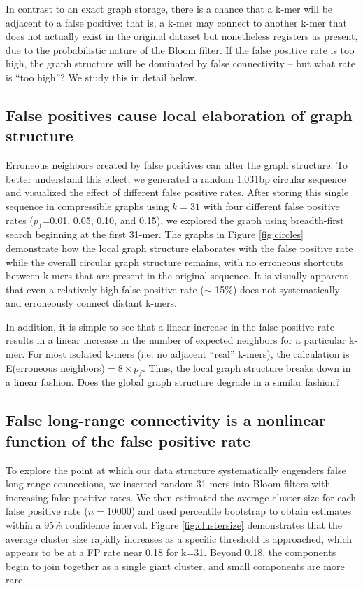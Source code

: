 \documentclass{pnastwo}
\begin{document}
\begin{article}
In contrast to an exact graph storage, there is a chance that a k-mer will
be adjacent to a false positive: that is, a k-mer may connect to another k-mer that does not
actually exist in the original dataset but nonetheless registers as present,
due to the probabilistic nature of the Bloom filter.  If the false positive rate is too high, the graph structure will
be dominated by false connectivity -- but what rate is ``too high''?  We study this in detail below.

\subsection{False positives cause local elaboration of graph structure}

Erroneous neighbors created by false positives can alter the graph
structure.  To better understand this effect, we generated a random
1,031bp circular sequence and visualized the effect of different false
positive rates.  After storing this single sequence in compressible
graphs using $k=31$ with four different false positive rates
($p_f$=0.01, 0.05, 0.10, and 0.15), we explored the graph using
breadth-first search beginning at the first 31-mer.  The graphs in
Figure \ref{fig:circles} demonstrate how the local graph structure elaborates with the
false positive rate while the overall circular graph structure
remains, with no erroneous shortcuts between k-mers that are present
in the original sequence.  It is visually apparent that even a relatively high false positive rate ($\sim$
15\%) does not systematically and erroneously connect distant k-mers.

In addition, it is simple to see that a linear increase in the false 
positive rate results in a linear increase in the number of expected 
neighbors for a particular k-mer. For most isolated k-mers (i.e. no adjacent 
``real'' k-mers), the calculation is 
E(erroneous neighbors)$ = 8 \times p_f$. Thus, the local graph 
structure breaks down in a linear fashion.  Does the global graph structure
degrade in a similar fashion?

\subsection{False long-range connectivity is a nonlinear function of the false positive rate}

To explore the point at which our data structure systematically
engenders false long-range connections, we inserted random 31-mers
into Bloom filters with increasing false positive rates.  We then
estimated the average cluster size for each false positive rate
($n=10000$) and used percentile bootstrap to obtain estimates within a
95\% confidence interval. Figure \ref{fig:clustersize} demonstrates that the average cluster size
rapidly increases as a specific threshold is approached, which appears
to be at a FP rate near 0.18 for k=31. Beyond 0.18, the components
begin to join together as a single giant cluster, and small components
are more rare.


\end{article}
\end{document}
